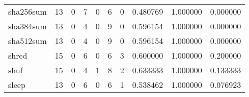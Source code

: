 \begin{tabular}{lrrrrrrrrr}
sha256sum &                                       13 &                                                  0 &                                                  7 &                                                  0 &                                                  6 &                                                  0 &                                           0.480769 &                               1.000000 &                             0.000000 \\
sha384sum &                                       13 &                                                  0 &                                                  4 &                                                  0 &                                                  9 &                                                  0 &                                           0.596154 &                               1.000000 &                             0.000000 \\
sha512sum &                                       13 &                                                  0 &                                                  4 &                                                  0 &                                                  9 &                                                  0 &                                           0.596154 &                               1.000000 &                             0.000000 \\
shred     &                                       15 &                                                  0 &                                                  6 &                                                  0 &                                                  6 &                                                  3 &                                           0.600000 &                               1.000000 &                             0.200000 \\
shuf      &                                       15 &                                                  0 &                                                  4 &                                                  1 &                                                  8 &                                                  2 &                                           0.633333 &                               1.000000 &                             0.133333 \\
sleep     &                                       13 &                                                  0 &                                                  6 &                                                  0 &                                                  6 &                                                  1 &                                           0.538462 &                               1.000000 &                             0.076923 \\

\end{tabular}
